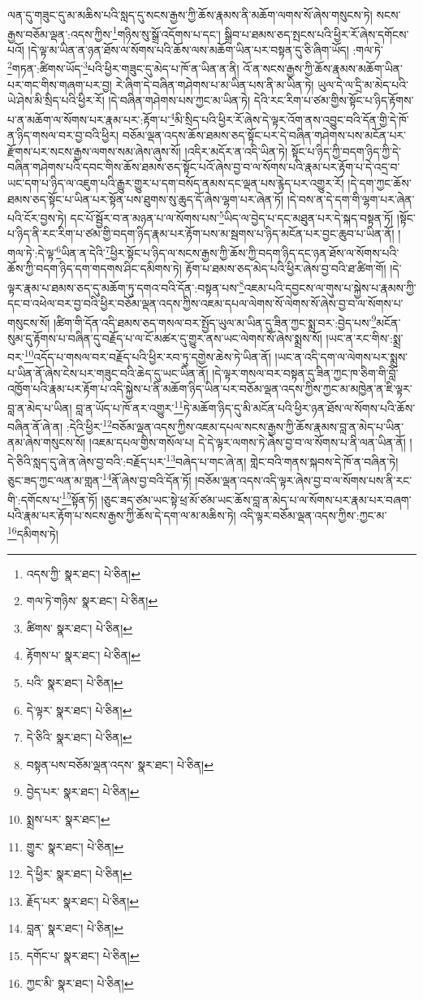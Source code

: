 ལན་དུ་གཟུང་དུ་མ་མཆིས་པའི་སླད་དུ་སངས་རྒྱས་ཀྱི་ཆོས་རྣམས་ནི་མཆོག་ལགས་སོ་ཞེས་གསུངས་ཏེ། སངས་རྒྱས་བཅོམ་ལྡན་:འདས་ཀྱིས་\footnote{འདས་ཀྱི་  སྣར་ཐང་།  པེ་ཅིན། }གཉིས་སུ་སྒྲོ་འདོགས་པ་དང་། སྒྲིབ་པ་ཐམས་ཅད་སྤངས་པའི་ཕྱིར་རོ་ཞེས་དགོངས་པའོ། །དེ་ལྟ་མ་ཡིན་ན་ཉན་ཐོས་ལ་སོགས་པའི་ཆོས་ལས་མཆོག་ཡིན་པར་བསྟན་དུ་ཅི་ཞིག་ཡོད། :གལ་ཏེ་\footnote{གལ་ཏེ་གཉིས་  སྣར་ཐང་།  པེ་ཅིན། }གཏན་:ཚིགས་ཡོད་\footnote{ཚིགས་  སྣར་ཐང་།  པེ་ཅིན། }པའི་ཕྱིར་གཟུང་དུ་མེད་པ་ཁོ་ན་ཡིན་ན་ནི། འོ་ན་སངས་རྒྱས་ཀྱི་ཆོས་རྣམས་མཆོག་ཡིན་པར་གང་གིས་གཞག་པར་བྱ། རེ་ཞིག་དེ་བཞིན་གཤེགས་པ་མ་ཡིན་པས་ནི་མ་ཡིན་ཏེ། ཡུལ་དེ་ལ་དྲི་མ་མེད་པའི་ཡེ་ཤེས་མི་སྲིད་པའི་ཕྱིར་རོ། །དེ་བཞིན་གཤེགས་པས་ཀྱང་མ་ཡིན་ཏེ། དེའི་རང་རིག་པ་ཙམ་གྱིས་སྟོང་པ་ཉིད་རྟོགས་པ་ན་མཆོག་ལ་སོགས་པར་རྣམ་པར་:རྟོག་པ་\footnote{རྟོགས་པ་  སྣར་ཐང་།  པེ་ཅིན། }མི་སྲིད་པའི་ཕྱིར་རོ་ཞེས་དེ་ལྟར་འོག་ནས་འབྱུང་བའི་དོན་གྱི་དེ་ཁོ་ན་ཉིད་གསལ་བར་བྱ་བའི་ཕྱིར། བཅོམ་ལྡན་འདས་ཆོས་ཐམས་ཅད་སྟོང་པར་དེ་བཞིན་གཤེགས་པས་མངོན་པར་རྫོགས་པར་སངས་རྒྱས་ལགས་སམ་ཞེས་ཞུས་སོ། །འདིར་མདོར་ན་འདི་ཡིན་ཏེ། སྟོང་པ་ཉིད་ཀྱི་བདག་ཉིད་ཀྱི་དེ་བཞིན་གཤེགས་པའི་དབང་གིས་ཆོས་ཐམས་ཅད་སྟོང་པའོ་ཞེས་བྱ་བ་ལ་སོགས་པའི་རྣམ་པར་རྟོག་པ་དེ་འདྲ་བ་ཡང་དག་པ་ཉིད་ལ་འཇུག་པའི་རྒྱུར་གྱུར་པ་དག་བསོད་ནམས་དང་ལྡན་པས་རྙེད་པར་འགྱུར་རོ། །དེ་དག་ཀྱང་ཆོས་ཐམས་ཅད་སྟོང་པ་ཡིན་པར་སྟོན་པས་ཐུགས་སུ་ཆུད་དོ་ཞེས་ལྷག་པར་ཞེན་ཏོ། །དེ་བས་ན་དེ་དག་གི་ལྷག་པར་ཞེན་པའི་ངོར་བྱས་ཏེ། དང་པོ་སྦྱོར་བ་ན་མཉན་པ་ལ་སོགས་པས་\footnote{པའི་  སྣར་ཐང་།  པེ་ཅིན། }ཡིད་ལ་བྱེད་པ་དང་མཐུན་པར་དེ་སྐད་བསྟན་ཏོ། །སྟོང་པ་ཉིད་ནི་རང་རིག་པ་ཙམ་གྱི་བདག་ཉིད་རྣམ་པར་རྟོག་པས་མ་སྦགས་པ་ཉིད་མངོན་པར་བྱང་ཆུབ་པ་ཡིན་ནོ། །གལ་ཏེ་:དེ་ལྟ་\footnote{དེ་ལྟར་  སྣར་ཐང་།  པེ་ཅིན། }ཡིན་ན་དེའི་\footnote{དེ་ཅིའི་  སྣར་ཐང་།  པེ་ཅིན། }ཕྱིར་སྟོང་པ་ཉིད་ལ་སངས་རྒྱས་ཀྱི་ཆོས་ཀྱི་བདག་ཉིད་དང་ཉན་ཐོས་ལ་སོགས་པའི་ཆོས་ཀྱི་བདག་ཉིད་དག་གདགས་ཤིང་དམིགས་ཏེ། རྟོག་པ་ཐམས་ཅད་མེད་པའི་ཕྱིར་ཞེས་བྱ་བའི་ཐ་ཚིག་གོ། །དེ་ལྟར་རྣམ་པ་ཐམས་ཅད་དུ་མཆོག་ཏུ་དགའ་བའི་དོན་:བསྟན་པས་\footnote{བསྟན་པས་བཅོམ་ལྡན་འདས་  སྣར་ཐང་།  པེ་ཅིན། }འཇམ་པའི་དབྱངས་ལ་གུས་པ་སྐྱེས་པ་རྣམས་ཀྱི་དང་བ་འཕེལ་བར་བྱ་བའི་ཕྱིར་བཅོམ་ལྡན་འདས་ཀྱིས་འཇམ་དཔལ་ལེགས་སོ་ལེགས་སོ་ཞེས་བྱ་བ་ལ་སོགས་པ་གསུངས་སོ། །ཚིག་གི་དོན་འདི་ཐམས་ཅད་གསལ་བར་སྤྱོད་ཡུལ་མ་ཡིན་དུ་ཟིན་ཀྱང་སྨྲ་བར་:བྱེད་པས་\footnote{བྱེད་པར་  སྣར་ཐང་།  པེ་ཅིན། }མངོན་སུམ་དུ་རྟོགས་པ་བཞིན་དུ་བརྗོད་པ་ལ་ངོ་མཚར་དུ་གྱུར་ནས་ཡང་ལེགས་སོ་ཞེས་སྨྲས་སོ། །ཡང་ན་རང་གིས་:སྨྲ་བར་\footnote{སྨྲས་པར་  སྣར་ཐང་། }འདོད་པ་གསལ་བར་བརྗོད་པའི་ཕྱིར་རབ་ཏུ་དགྱེས་ཆེས་ཏེ་ཡིན་ནོ། །ཡང་ན་འདི་དག་ལ་ལེགས་པར་སྨྲས་པ་ཡིན་ནོ་ཞེས་ངེས་པར་གཟུང་བའི་ཆེད་དུ་ཡང་ཡིན་ནོ། །དེ་ལྟར་གསལ་བར་བསྟན་དུ་ཟིན་ཀྱང་ཁ་ཅིག་གི་བློ་འཁྱོག་པའི་རྣམ་པར་རྟོག་པ་འདི་སྐྱེས་པ་ནི་མཆོག་ཉིད་ཡིན་པར་བཅོམ་ལྡན་འདས་ཀྱིས་ཀྱང་མ་མཁྱེན་ན་ཇི་ལྟར་བླ་ན་མེད་པ་ཡིན། བླ་ན་ཡོད་པ་ཁོ་ནར་འགྱུར་\footnote{གྱུར་  སྣར་ཐང་།  པེ་ཅིན། }ཏེ་མཆོག་ཉིད་དུ་མི་མངོན་པའི་ཕྱིར་ཉན་ཐོས་ལ་སོགས་པའི་ཆོས་བཞིན་ནོ་ཞེ་ན། :དེའི་ཕྱིར་\footnote{དེ་ཕྱིར་  སྣར་ཐང་།  པེ་ཅིན། }བཅོམ་ལྡན་འདས་ཀྱིས་འཇམ་དཔལ་སངས་རྒྱས་ཀྱི་ཆོས་རྣམས་བླ་ན་མེད་པ་ཡིན་ནམ་ཞེས་གསུངས་སོ། །འཇམ་དཔལ་གྱིས་གསོལ་པ། དེ་དེ་ལྟར་ལགས་ཏེ་ཞེས་བྱ་བ་ལ་སོགས་པ་ནི་ལན་ཡིན་ནོ། །དེ་ཅིའི་སླད་དུ་ཞེ་ན་ཞེས་བྱ་བའི་:བརྗོད་པར་\footnote{རྗོད་པར་  སྣར་ཐང་།  པེ་ཅིན། }བཞེད་པ་གང་ཞེ་ན། གླེང་བའི་གནས་སྐབས་དེ་ཁོ་ན་བཞིན་ཏེ། ཅུང་ཟད་ཀྱང་ལན་མ་གླན་\footnote{བླན་  སྣར་ཐང་།  པེ་ཅིན། }ནོ་ཞེས་བྱ་བའི་དོན་ཏོ། །བཅོམ་ལྡན་འདས་འདི་ལྟར་ཞེས་བྱ་བ་ལ་སོགས་པས་ནི་རང་གི་:དགོངས་པ་\footnote{དགོང་པ་  སྣར་ཐང་།  པེ་ཅིན། }སྟོན་ཏོ། །ཅུང་ཟད་ཙམ་ཡང་སྟེ་ཕྲ་མོ་ཙམ་ཡང་ཆོས་བླ་ན་མེད་པ་ལ་སོགས་པར་རྣམ་པར་བཞག་པའི་རྣམ་པར་རྟོག་པ་སངས་རྒྱས་ཀྱི་ཆོས་དེ་དག་ལ་མ་མཆིས་ཏེ། འདི་ལྟར་བཅོམ་ལྡན་འདས་ཀྱིས་:ཀྱང་མ་\footnote{ཀྱང་མི་  སྣར་ཐང་།  པེ་ཅིན། }དམིགས་ཏེ། 